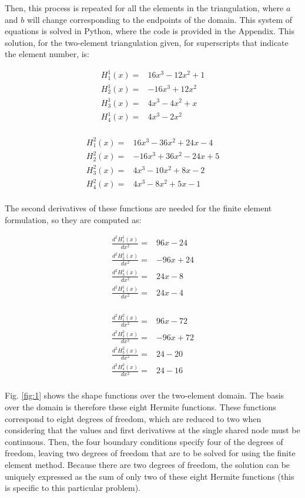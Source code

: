 \documentclass[10pt]{article}
\newcommand{\beqa}{\begin{equation}\begin{aligned}}
\newcommand{\eeqa}{\end{aligned}\end{equation}}
\begin{document}
Then, this process is repeated for all the elements in the triangulation, where \(a\) and \(b\) will change corresponding to the endpoints of the domain. This system of equations is solved in Python, where the code is provided in the Appendix. This solution, for the two-element triangulation given, for superscripts that indicate the element number, is:

\beqa
H_1^1(x)=&16x^3-12x^2+1\\
H_2^1(x)=&-16x^3+12x^2\\
H_3^1(x)=&4x^3-4x^2+x\\
H_4^1(x)=&4x^3-2x^2\\
\eeqa

\beqa
H_1^2(x)=&16x^3-36x^2+24x-4\\
H_2^2(x)=&-16x^3+36x^2-24x+5\\
H_3^2(x)=&4x^3-10x^2+8x-2\\
H_4^2(x)=&4x^3-8x^2+5x-1\\
\eeqa

The second derivatives of these functions are needed for the finite element formulation, so they are computed as:

\beqa
\frac{d^2H_1^1(x)}{dx^2}=& 96x-24\\
\frac{d^2H_2^1(x)}{dx^2}=& -96x+24\\
\frac{d^2H_3^1(x)}{dx^2}=& 24x-8\\
\frac{d^2H_4^1(x)}{dx^2}=& 24x-4\\
\eeqa

\beqa
\frac{d^2H_1^2(x)}{dx^2}=& 96x-72\\
\frac{d^2H_2^2(x)}{dx^2}=& -96x+72\\
\frac{d^2H_3^2(x)}{dx^2}=& 24-20\\
\frac{d^2H_4^2(x)}{dx^2}=& 24-16\\
\eeqa

Fig. \ref{fig:1} shows the shape functions over the two-element domain. The basis over the domain is therefore these eight Hermite functions. These functions correspond to eight degrees of freedom, which are reduced to two when considering that the values and first derivatives at the single shared node must be continuous. Then, the four boundary conditions specify four of the degrees of freedom, leaving two degrees of freedom that are to be solved for using the finite element method. Because there are two degrees of freedom, the solution can be uniquely expressed as the sum of only two of these eight Hermite functions (this is specific to this particular problem). 
\end{document}
